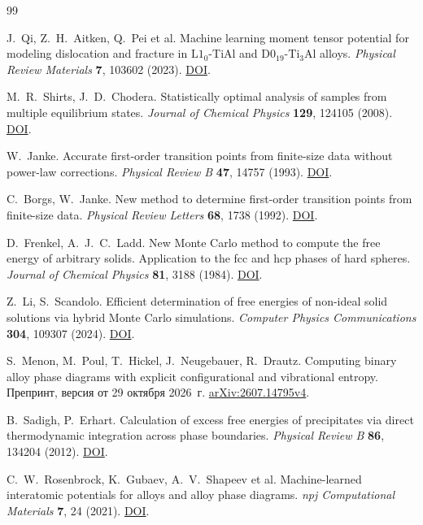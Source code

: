 \documentclass[11pt,a4paper]{article}
\begin{document}
\begin{thebibliography}{99}

J.~Qi, Z.~H.~Aitken, Q.~Pei et al.
Machine learning moment tensor potential for modeling dislocation and fracture
in \(\mathrm{L1}_0\)-TiAl and \(\mathrm{D0}_{19}\)-\(\mathrm{Ti}_3\mathrm{Al}\) alloys.
\emph{Physical Review Materials} \textbf{7}, 103602 (2023).
\href{https://doi.org/10.1103/PhysRevMaterials.7.103602}{DOI}.

M.~R.~Shirts, J.~D.~Chodera.
Statistically optimal analysis of samples from multiple equilibrium states.
\emph{Journal of Chemical Physics} \textbf{129}, 124105 (2008).
\href{https://doi.org/10.1063/1.2978177}{DOI}.

W.~Janke.
Accurate first-order transition points from finite-size data without power-law corrections.
\emph{Physical Review B} \textbf{47}, 14757 (1993).
\href{https://doi.org/10.1103/PhysRevB.47.14757}{DOI}.

C.~Borgs, W.~Janke.
New method to determine first-order transition points from finite-size data.
\emph{Physical Review Letters} \textbf{68}, 1738 (1992).
\href{https://doi.org/10.1103/PhysRevLett.68.1738}{DOI}.

D.~Frenkel, A.~J.~C.~Ladd.
New Monte Carlo method to compute the free energy of arbitrary solids.
Application to the fcc and hcp phases of hard spheres.
\emph{Journal of Chemical Physics} \textbf{81}, 3188 (1984).
\href{https://doi.org/10.1063/1.448024}{DOI}.

Z.~Li, S.~Scandolo.
Efficient determination of free energies of non-ideal solid solutions via hybrid
Monte Carlo simulations.
\emph{Computer Physics Communications} \textbf{304}, 109307 (2024).
\href{https://doi.org/10.1016/j.cpc.2024.109307}{DOI}.

S.~Menon, M.~Poul, T.~Hickel, J.~Neugebauer, R.~Drautz.
Computing binary alloy phase diagrams with explicit configurational and
vibrational entropy.
Препринт, версия от 29 октября 2026~г.
\href{https://arxiv.org/abs/2607.14795v4}{arXiv:2607.14795v4}.

B.~Sadigh, P.~Erhart.
Calculation of excess free energies of precipitates via direct thermodynamic
integration across phase boundaries.
\emph{Physical Review B} \textbf{86}, 134204 (2012).
\href{https://doi.org/10.1103/PhysRevB.86.134204}{DOI}.

C.~W.~Rosenbrock, K.~Gubaev, A.~V.~Shapeev et al.
Machine-learned interatomic potentials for alloys and alloy phase diagrams.
\emph{npj Computational Materials} \textbf{7}, 24 (2021).
\href{https://doi.org/10.1038/s41524-020-00477-2}{DOI}.


\end{thebibliography}
\end{document}
